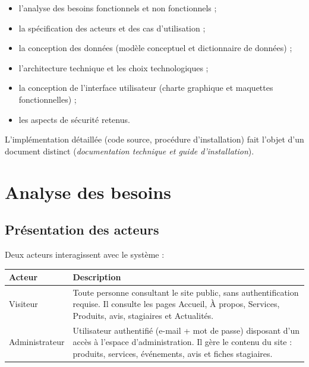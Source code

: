\documentclass[11pt,a4paper]{report}
\begin{document}
\begin{itemize}[leftmargin=1.2em]
    \item l'analyse des besoins fonctionnels et non fonctionnels ;
    \item la spécification des acteurs et des cas d'utilisation ;
    \item la conception des données (modèle conceptuel et dictionnaire de
    données) ;
    \item l'architecture technique et les choix technologiques ;
    \item la conception de l'interface utilisateur (charte graphique et
    maquettes fonctionnelles) ;
    \item les aspects de sécurité retenus.
\end{itemize}

L'implémentation détaillée (code source, procédure d'installation) fait
l'objet d'un document distinct (\emph{documentation technique et guide
d'installation}).

\chapter{Analyse des besoins}

\section{Présentation des acteurs}

Deux acteurs interagissent avec le système :

\begin{center}
\renewcommand{\arraystretch}{1.4}
\begin{tabular}{L{3.2cm} L{10.3cm}}
\toprule
{}
\textbf{Acteur} & \textbf{Description} \\
\midrule
Visiteur & Toute personne consultant le site public, sans authentification
requise. Il consulte les pages Accueil, À propos, Services, Produits, avis, stagiaires et
Actualités. \\
\addlinespace
Administrateur & Utilisateur authentifié (e-mail + mot de passe) disposant
d'un accès à l'espace d'administration. Il gère le contenu du site : produits,
services, événements, avis et fiches stagiaires. \\
\bottomrule
\end{tabular}
\end{center}
\end{document}
